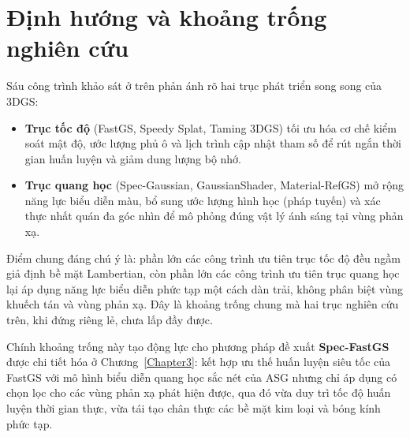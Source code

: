 \section{Định hướng và khoảng trống nghiên cứu}
\label{sec:related-work-synthesis}

Sáu công trình khảo sát ở trên phản ánh rõ hai trục phát triển song song của 3DGS:
\begin{itemize}
    \item \textbf{Trục tốc độ} (FastGS, Speedy Splat, Taming 3DGS) tối ưu hóa cơ chế kiểm soát mật độ, ước lượng phủ ô và lịch trình cập nhật tham số để rút ngắn thời gian huấn luyện và giảm dung lượng bộ nhớ.
    \item \textbf{Trục quang học} (Spec-Gaussian, GaussianShader, Material-RefGS) mở rộng năng lực biểu diễn màu, bổ sung ước lượng hình học (pháp tuyến) và xác thực nhất quán đa góc nhìn để mô phỏng đúng vật lý ánh sáng tại vùng phản xạ.
\end{itemize}

Điểm chung đáng chú ý là: phần lớn các công trình ưu tiên trục tốc độ đều ngầm giả định bề mặt Lambertian, còn phần lớn các công trình ưu tiên trục quang học lại áp dụng năng lực biểu diễn phức tạp một cách dàn trải, không phân biệt vùng khuếch tán và vùng phản xạ. Đây là khoảng trống chung mà hai trục nghiên cứu trên, khi đứng riêng lẻ, chưa lấp đầy được. 

Chính khoảng trống này tạo động lực cho phương pháp đề xuất \textbf{Spec-FastGS} được chi tiết hóa ở Chương~\ref{Chapter3}: kết hợp ưu thế huấn luyện siêu tốc của FastGS với mô hình biểu diễn quang học sắc nét của ASG nhưng chỉ áp dụng có chọn lọc cho các vùng phản xạ phát hiện được, qua đó vừa duy trì tốc độ huấn luyện thời gian thực, vừa tái tạo chân thực các bề mặt kim loại và bóng kính phức tạp.
